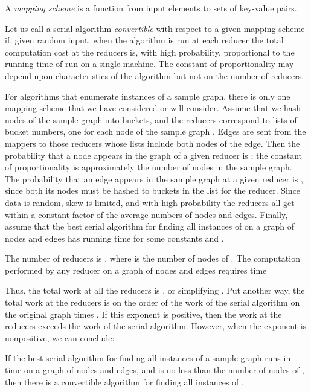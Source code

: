 \begin{definition}
A {\em mapping scheme} is a function from input elements to sets of key-value pairs.
\end{definition}

\begin{definition}
Let us call a serial algorithm  {\em convertible} with respect to a given mapping scheme if, given random input, when the algorithm is run at each reducer the total computation cost at the reducers is, with high probability, proportional to the running time of  run on a single machine.  The constant of proportionality may depend upon characteristics of the algorithm but not on the number of reducers.
\end{definition}

For algorithms that enumerate instances of a sample graph, there is only one mapping scheme that we have considered or will consider.
Assume that we hash nodes of the sample graph into  buckets, and the reducers correspond to lists of bucket numbers, one for each node of the sample graph .
Edges are sent from the mappers to those reducers whose lists include both nodes of the edge.  Then the probability that a node appears in the graph of a given reducer is ; the constant of proportionality is approximately the number of nodes in the sample graph.  The probability that an edge appears in the sample graph at a given reducer is , since both its nodes must be hashed to buckets in the list for the reducer.  Since data is random, skew is limited, and with high probability the reducers all get within a constant factor of the average numbers of nodes and edges.  Finally, assume that the best serial algorithm for finding all instances of  on a graph of  nodes and  edges has running time  for some constants  and .

The number of reducers  is , where  is the number of nodes of .
The computation performed by any reducer on a graph of  nodes and  edges requires time

Thus, the total work at all the reducers is , or simplifying .  Put another way, the total work at the reducers is on the order of the work of the serial algorithm on the original graph times .  If this exponent is positive, then the work at the reducers exceeds the work of the serial algorithm.  However, when the exponent is nonpositive, we can conclude:

\begin{theorem}
\label{comp-cost-th}
If the best serial algorithm for finding all instances of a sample graph  runs in time  on a graph of  nodes and  edges, and  is no less than the number of nodes of , then there is a convertible algorithm for finding all instances of .
\end{theorem}

